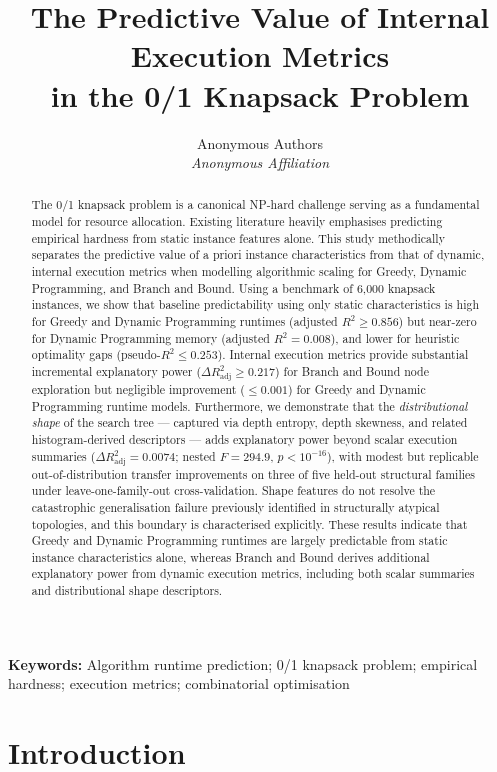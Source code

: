 \documentclass[11pt,a4paper]{article}
\title{The Predictive Value of Internal Execution Metrics\\in the 0/1 Knapsack Problem}
\author{Anonymous Authors \\ \textit{Anonymous Affiliation}}
\date{}
\begin{document}
\maketitle

\begin{abstract}
The 0/1 knapsack problem is a canonical NP-hard challenge serving
as a fundamental model for resource allocation. Existing literature heavily
emphasises predicting empirical hardness from static instance features alone.
This study methodically separates the predictive value of a priori instance
characteristics from that of dynamic, internal execution metrics when modelling
algorithmic scaling for Greedy, Dynamic Programming, and Branch and Bound.
Using a benchmark of 6,000 knapsack instances, we show that baseline
predictability using only static characteristics is high for Greedy and
Dynamic Programming runtimes (adjusted $R^2 \ge 0.856$) but near-zero
for Dynamic Programming memory (adjusted $R^2 = 0.008$), and lower for
heuristic optimality gaps (pseudo-$R^2 \le 0.253$). Internal execution
metrics provide substantial incremental explanatory power ($\Delta
R^2_{\mathrm{adj}} \ge 0.217$) for Branch and Bound node exploration but
negligible improvement ($\le 0.001$) for Greedy and Dynamic Programming runtime models.
Furthermore, we demonstrate that the \emph{distributional shape} of the
search tree --- captured via depth entropy, depth skewness, and related
histogram-derived descriptors --- adds explanatory power beyond scalar
execution summaries ($\Delta R^2_{\mathrm{adj}} = 0.0074$; nested $F = 294.9$,
$p < 10^{-16}$), with modest but replicable out-of-distribution transfer
improvements on three of five held-out structural families under leave-one-family-out
cross-validation. Shape features do not resolve the catastrophic generalisation
failure previously identified in structurally atypical topologies, and this boundary
is characterised explicitly. These results indicate that Greedy and Dynamic Programming
runtimes are largely predictable from static instance characteristics alone, whereas
Branch and Bound derives additional explanatory power from dynamic execution
metrics, including both scalar summaries and distributional shape descriptors.
\end{abstract}

\bigskip
\noindent\textbf{Keywords:} Algorithm runtime prediction; 0/1
knapsack problem; empirical hardness; execution metrics; combinatorial
optimisation

\section{Introduction}
\end{document}
